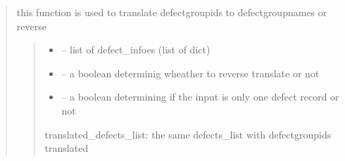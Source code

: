 \documentclass[letterpaper,10pt,english]{sphinxmanual}
\begin{document}
\begin{quote}
\begin{savenotes}\begin{fulllineitems}
\label{\detokenize{setting/backend/defect_management_funcs:oxin.backend.defect_management_funcs.change_defect_group_id_to_name}}
\pysigstartsignatures
{}
\pysigstopsignatures
\sphinxAtStartPar
this function is used to translate defect\sphinxhyphen{}group\sphinxhyphen{}ids to defect\sphinxhyphen{}group\sphinxhyphen{}names or reverse
\begin{quote}\begin{description}
\begin{itemize}
\item {} 
\sphinxAtStartPar
{} – list of defect\_infoes (list of dict)

\item {} 
\sphinxAtStartPar
{} – a boolean determinig wheather to reverse translate or not

\item {} 
\sphinxAtStartPar
{} – a boolean determining if the input is only one defect record or not

\end{itemize}

\sphinxAtStartPar
translated\_defects\_list: the same defects\_list with defect\sphinxhyphen{}group\sphinxhyphen{}ids translated

\end{description}\end{quote}

\end{fulllineitems}\end{savenotes}



\end{quote}
\end{document}
